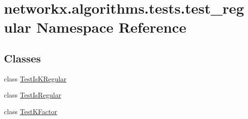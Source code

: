 \hypertarget{namespacenetworkx_1_1algorithms_1_1tests_1_1test__regular}{}\section{networkx.\+algorithms.\+tests.\+test\+\_\+regular Namespace Reference}
\label{namespacenetworkx_1_1algorithms_1_1tests_1_1test__regular}
\subsection*{Classes}
\begin{DoxyCompactItemize}
\item 
class \hyperlink{classnetworkx_1_1algorithms_1_1tests_1_1test__regular_1_1TestIsKRegular}{Test\+Is\+K\+Regular}
\item 
class \hyperlink{classnetworkx_1_1algorithms_1_1tests_1_1test__regular_1_1TestIsRegular}{Test\+Is\+Regular}
\item 
class \hyperlink{classnetworkx_1_1algorithms_1_1tests_1_1test__regular_1_1TestKFactor}{Test\+K\+Factor}
\end{DoxyCompactItemize}

